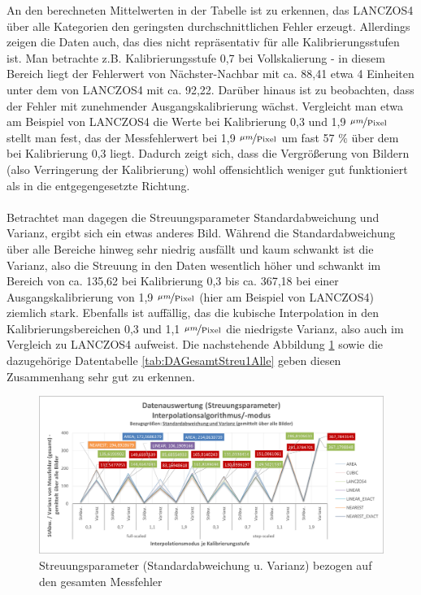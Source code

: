\documentclass[
fontsize=10pt, 
listof = totoc,
parskip = half	
]{report}
\begin{document}
\noindent An den berechneten Mittelwerten in der Tabelle ist zu erkennen, das LANCZOS4 über alle Kategorien den geringsten durchschnittlichen Fehler erzeugt. Allerdings zeigen die Daten auch, das dies nicht repräsentativ für alle Kalibrierungsstufen ist. Man betrachte z.B. Kalibrierungsstufe 0,7 bei Vollskalierung - in diesem Bereich liegt der Fehlerwert von Nächster-Nachbar mit ca. 88,41 etwa 4 Einheiten unter dem von LANCZOS4 mit ca. 92,22. Darüber hinaus ist zu beobachten, dass der Fehler mit zunehmender Ausgangskalibrierung wächst. Vergleicht man etwa am Beispiel von LANCZOS4 die Werte bei Kalibrierung  0,3  und 1,9 $\nicefrac{\mu m}{\text{Pixel}}$ stellt man fest, das der Messfehlerwert bei 1,9 $\nicefrac{\mu m}{\text{Pixel}}$ um fast 57 $\%$ über dem bei Kalibrierung 0,3 liegt. Dadurch zeigt sich, dass die Vergrößerung von Bildern (also Verringerung der Kalibrierung) wohl offensichtlich weniger gut funktioniert als in die entgegengesetzte Richtung.
\\\\
Betrachtet man dagegen die Streuungsparameter Standardabweichung und Varianz, ergibt sich ein etwas anderes Bild. Während die Standardabweichung über alle Bereiche hinweg sehr niedrig ausfällt und kaum schwankt ist die Varianz, also die Streuung in den Daten wesentlich höher und schwankt im Bereich von ca. 135,62 bei Kalibrierung 0,3 bis ca. 367,18 bei einer Ausgangskalibrierung von 1,9 $\nicefrac{\mu m}{\text{Pixel}}$ (hier am Beispiel von LANCZOS4) ziemlich stark. Ebenfalls ist auffällig, das die kubische Interpolation in den Kalibrierungsbereichen 0,3 und 1,1 $\nicefrac{\mu m}{\text{Pixel}}$ die niedrigste Varianz, also auch im Vergleich zu LANCZOS4 aufweist.  Die nachstehende Abbildung \ref{fig:DAGesamtStreu1Alle} sowie die dazugehörige Datentabelle \ref{tab:DAGesamtStreu1Alle} geben diesen Zusammenhang sehr gut zu erkennen.

\begin{figure}[H]
	\centering
	\includegraphics[width=\textwidth, height=\textheight, keepaspectratio]{pics/DA_Gesamt_Streu1_Alle}
	\caption{Streuungsparameter (Standardabweichung u. Varianz) bezogen auf den gesamten Messfehler}
	\label{fig:DAGesamtStreu1Alle}
\end{figure}
	
\end{document}
